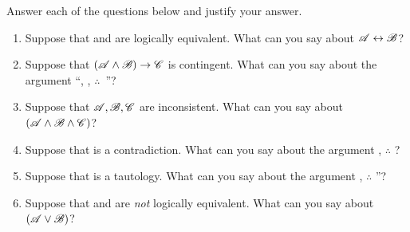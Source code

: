 \noindent\problempart
\label{pr.TT.concepts}
Answer each of the questions below and justify your answer.
\begin{enumerate}
\item Suppose that  and  are logically equivalent. What can you say about $\mathscr{A}\leftrightarrow\mathscr{B}$?
\item Suppose that $(\mathscr{A}\wedge\mathscr{B})\rightarrow\mathscr{C}$ is contingent. What can you say about the argument ``, , $\therefore$\ ''?
\item Suppose that $\mathscr{A},\mathscr{B}, \mathscr{C}$ are inconsistent. What can you say about $(\mathscr{A}\wedge\mathscr{B}\wedge\mathscr{C})$?
\item Suppose that  is a contradiction. What can you say about the argument ,  $\therefore $  ?
\item Suppose that  is a tautology. What can you say about the argument ,  $\therefore $ ''?
\item Suppose that  and  are \emph{not} logically equivalent. What can you say about $(\mathscr{A}\vee\mathscr{B})$?
\end{enumerate}
